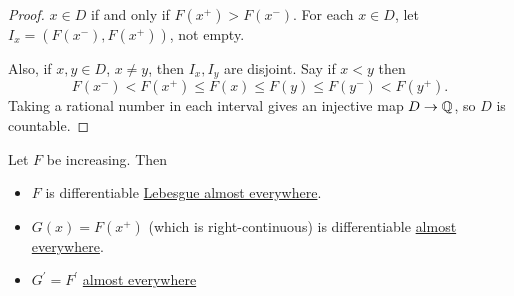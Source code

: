 \begin{proof}
	\(x \in D\) if and only if \(F(x^+) > F(x^-)\). For each \(x \in D\), let \(I_x = (F(x^-),F(x^+))\), not empty.

	Also, if \(x,y \in D\), \(x \neq y\), then \(I_x,I_y\) are disjoint. Say if \(x < y\) then
	\[
		F(x^-) < F(x^+) \leq F(x) \leq F(y) \leq F(y^-) < F(y^+).
	\]
	Taking a rational number in each interval gives an injective map \(D \to \mathbb{\MakeUppercase{q}}\), so \(D\) is countable.
\end{proof}

\begin{theorem}\label{thm:monotone-differentiation}
	Let \(F\) be increasing. Then
	\begin{itemize}
		\item \(F\) is differentiable \hyperref[def:mu-almost-everywhere]{Lebesgue almost everywhere}.
		\item \(G(x) = F(x^+)\) (which is right-continuous) is differentiable \hyperref[def:mu-almost-everywhere]{almost everywhere}.
		\item \(G^\prime  = F^\prime \) \hyperref[def:mu-almost-everywhere]{almost everywhere}
	\end{itemize}
\end{theorem}

